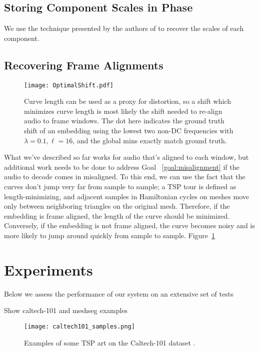 \documentclass[runningheads]{llncs}
\begin{document}
\subsection{Storing Component Scales in Phase}
\label{sec:componentscales}

We use the technique presented by the authors of \cite{xiaoxiao_dong_data_2004} to recover the scales of each component.

\subsection{Recovering Frame Alignments}

\begin{figure}
  \centering
  \texttt{[image: OptimalShift.pdf]}
  \caption{Curve length can be used as a proxy for distortion, so a shift which minimizes curve length is most likely the shift needed to re-align audio to frame windows.  The dot here indicates the ground truth shift of an embedding using the lowest two non-DC frequencies with $\lambda=0.1, \ell=16$, and the global mins exactly match ground truth.}
  \label{fig:FrameAlignments}
\end{figure}

What we've described so far works for audio that's aligned to each window, but additional work needs to be done to address Goal ~\ref{goal:misalignment} if the audio to decode comes in misaligned.  To this end, we can use the fact that the curves don't jump very far from sample to sample; a TSP tour is defined as length-minimizing, and adjacent samples in Hamiltonian cycles on meshes move only between neighboring triangles on the original mesh.  Therefore, if the embedding is frame aligned, the length of the curve should be minimized.  Conversely, if the embedding is not frame aligned, the curve becomes noisy and is more likely to jump around quickly from sample to sample.  Figure~\ref{fig:FrameAlignments}





\section{Experiments}
\label{sec:experiments}

Below we assess the performance of our system on an extensive set of tests

Show caltech-101 and meshseg examples

\begin{figure}
  \centering
  \texttt{[image: caltech101\_samples.png]}
  \caption{Examples of some TSP art on the Caltech-101 dataset \cite{li_andreeto_ranzato_perona_2022}.}
  \label{fig:caltech101examples}
\end{figure}
\end{document}
